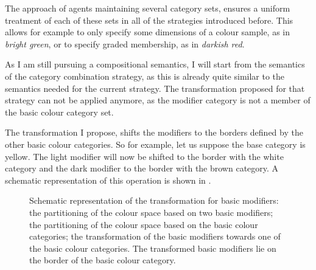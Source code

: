 The approach of agents maintaining several category sets, ensures a
uniform treatment of each of these sets in all of the strategies
introduced before. This allows for example to only specify some
dimensions of a colour sample, as in \textit{bright green}, or to specify
graded membership, as in \textit{darkish red}.

As I am still pursuing a compositional semantics, I will start from
the semantics of the category combination strategy, as this is
already quite similar to the semantics needed for the current
strategy. The transformation proposed for that strategy can not be
applied anymore, as the modifier category is not a member of the basic
colour category set.

The transformation I propose, shifts the modifiers to the borders
defined by the other basic colour categories. So for example, let us
suppose the base category is yellow. The light modifier will now be
shifted to the border with the white category and the dark modifier to
the border with the brown category. A schematic representation of this
operation is shown in .

\begin{figure}
\centering
{}
\caption[Schematic representation of the transformation for basic
modifiers]{Schematic representation of the transformation for
  basic modifiers:  the
  partitioning of the colour space based on two basic modifiers;
   the partitioning of the
  colour space based on the basic colour categories;
   the transformation
  of the basic modifiers towards one of the basic colour
  categories. The transformed basic modifiers lie on the border
 of the basic colour category.}
\label{f:ams-semantics-schematic}
\end{figure}

